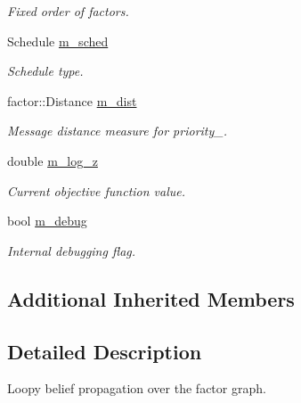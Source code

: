 \begin{DoxyCompactItemize}
\begin{DoxyCompactList}\small\item\em Fixed order of factors. \end{DoxyCompactList}\item 
Schedule \hyperlink{classmerlin_1_1lbp_a612e3dee4fede5efb97edf155c7d6d6f}{m\+\_\+sched}\hypertarget{classmerlin_1_1lbp_a612e3dee4fede5efb97edf155c7d6d6f}{}\label{classmerlin_1_1lbp_a612e3dee4fede5efb97edf155c7d6d6f}

\begin{DoxyCompactList}\small\item\em Schedule type. \end{DoxyCompactList}\item 
factor\+::\+Distance \hyperlink{classmerlin_1_1lbp_ad38eb15e14383af32cc33beed58d0a33}{m\+\_\+dist}\hypertarget{classmerlin_1_1lbp_ad38eb15e14383af32cc33beed58d0a33}{}\label{classmerlin_1_1lbp_ad38eb15e14383af32cc33beed58d0a33}

\begin{DoxyCompactList}\small\item\em Message distance measure for priority\+\_\+. \end{DoxyCompactList}\item 
double \hyperlink{classmerlin_1_1lbp_aae920e31f7765ddedd24326ad28dde15}{m\+\_\+log\+\_\+z}\hypertarget{classmerlin_1_1lbp_aae920e31f7765ddedd24326ad28dde15}{}\label{classmerlin_1_1lbp_aae920e31f7765ddedd24326ad28dde15}

\begin{DoxyCompactList}\small\item\em Current objective function value. \end{DoxyCompactList}\item 
bool \hyperlink{classmerlin_1_1lbp_a0f344f5422987ca3b2bd13cb5c3e5368}{m\+\_\+debug}\hypertarget{classmerlin_1_1lbp_a0f344f5422987ca3b2bd13cb5c3e5368}{}\label{classmerlin_1_1lbp_a0f344f5422987ca3b2bd13cb5c3e5368}

\begin{DoxyCompactList}\small\item\em Internal debugging flag. \end{DoxyCompactList}\end{DoxyCompactItemize}
\subsection*{Additional Inherited Members}


\subsection{Detailed Description}
Loopy belief propagation over the factor graph.

